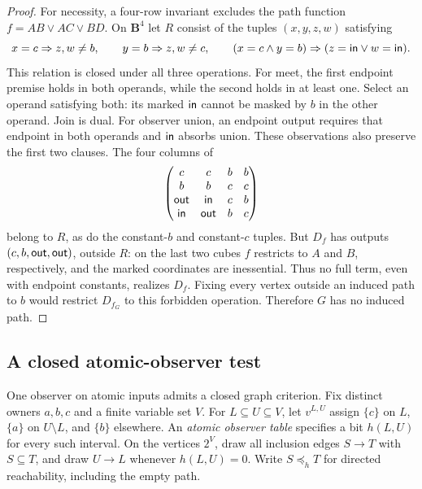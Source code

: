 \begin{proof}
For necessity, a four-row invariant excludes the path function
$f=AB\lor AC\lor BD$. On $\mathbf B^4$ let $R$ consist of the tuples
$(x,y,z,w)$ satisfying
\[
 x=c\Rightarrow z,w\ne b,\qquad
 y=b\Rightarrow z,w\ne c,\qquad
 (x=c\land y=b)\Rightarrow(z=\mathsf{in}\lor w=\mathsf{in}).
\]
This relation is closed under all three operations. For meet, the first
endpoint premise holds in both operands, while the second holds in at
least one. Select an operand satisfying both: its marked $\mathsf{in}$
cannot be masked by $b$ in the other operand. Join is dual. For observer
union, an endpoint output requires that endpoint in both operands and
$\mathsf{in}$ absorbs union. These observations also preserve the first
two clauses. The four columns of
\[
 \begin{pmatrix}
 c&c&b&b\\ b&b&c&c\\
 \mathsf{out}&\mathsf{in}&c&b\\
 \mathsf{in}&\mathsf{out}&b&c
 \end{pmatrix}
\]
belong to $R$, as do the constant-$b$ and constant-$c$ tuples. But $D_f$
has outputs $(c,b,\mathsf{out},\mathsf{out})$, outside $R$: on the last two
cubes $f$ restricts to $A$ and $B$, respectively, and the marked
coordinates are inessential. Thus no full term, even with endpoint
constants, realizes $D_f$. Fixing every vertex outside an induced path
to $b$ would restrict $D_{f_G}$ to this forbidden operation. Therefore
$G$ has no induced path.
\end{proof}





\subsection{A closed atomic-observer test}
\label{app:core-atomic-observer}

One observer on atomic inputs admits a closed graph criterion. Fix distinct
owners $a,b,c$ and a finite variable set $V$. For $L\subseteq U\subseteq V$,
let $v^{L,U}$ assign $\{c\}$ on $L$, $\{a\}$ on $U\setminus L$, and
$\{b\}$ elsewhere. An \emph{atomic observer table} specifies a bit
$h(L,U)$ for every such interval. On the vertices $2^V$, draw all inclusion
edges $S\to T$ with $S\subseteq T$, and draw $U\to L$ whenever
$h(L,U)=0$. Write $S\preceq_h T$ for directed reachability, including the
empty path.

